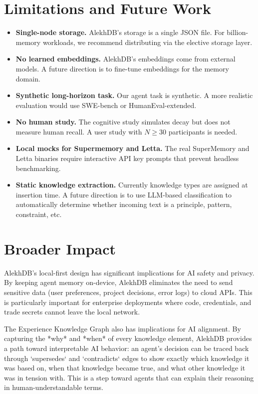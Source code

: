 \section{Limitations and Future Work}

\begin{itemize}
\item \textbf{Single-node storage.} AlekhDB's storage is a single JSON file. For billion-memory workloads, we recommend distributing via the elective storage layer.
\item \textbf{No learned embeddings.} AlekhDB's embeddings come from external models. A future direction is to fine-tune embeddings for the memory domain.
\item \textbf{Synthetic long-horizon task.} Our agent task is synthetic. A more realistic evaluation would use SWE-bench or HumanEval-extended.
\item \textbf{No human study.} The cognitive study simulates decay but does not measure human recall. A user study with $N \geq 30$ participants is needed.
\item \textbf{Local mocks for Supermemory and Letta.} The real SuperMemory and Letta binaries require interactive API key prompts that prevent headless benchmarking.
\item \textbf{Static knowledge extraction.} Currently knowledge types are assigned at insertion time. A future direction is to use LLM-based classification to automatically determine whether incoming text is a principle, pattern, constraint, etc.
\end{itemize}

\section{Broader Impact}

AlekhDB's local-first design has significant implications for AI safety and privacy. By keeping agent memory on-device, AlekhDB eliminates the need to send sensitive data (user preferences, project decisions, error logs) to cloud APIs. This is particularly important for enterprise deployments where code, credentials, and trade secrets cannot leave the local network.

The Experience Knowledge Graph also has implications for AI alignment. By capturing the *why* and *when* of every knowledge element, AlekhDB provides a path toward interpretable AI behavior: an agent's decision can be traced back through `supersedes` and `contradicts` edges to show exactly which knowledge it was based on, when that knowledge became true, and what other knowledge it was in tension with. This is a step toward agents that can explain their reasoning in human-understandable terms.

